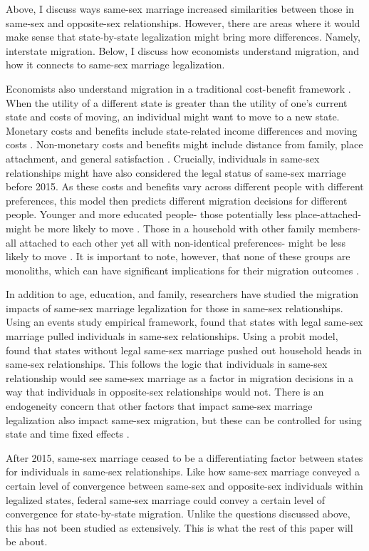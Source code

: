 \documentclass[12pt,letterpaper]{article}
\begin{document}
Above, I discuss ways same-sex marriage increased similarities between those in same-sex and opposite-sex relationships. However, there are areas where it would make sense that state-by-state legalization might bring more differences. Namely, interstate migration. Below, I discuss how economists understand migration, and how it connects to same-sex marriage legalization.

Economists also understand migration in a traditional cost-benefit framework \citep{12, 8}. When the utility of a different state is greater than the utility of one’s current state and costs of moving, an individual might want to move to a new state. Monetary costs and benefits include state-related income differences and moving costs \citep{1, 15, 16, 17}. Non-monetary costs and benefits might include distance from family, place attachment, and general satisfaction \citep{1, 15}. Crucially, individuals in same-sex relationships might have also considered the legal status of same-sex marriage before 2015. As these costs and benefits vary across different people with different preferences, this model then predicts different migration decisions for different people. Younger and more educated people- those potentially less place-attached- might be more likely to move \citep{17}. Those in a household with other family members- all attached to each other yet all with non-identical preferences- might be less likely to move \citep{16}. It is important to note, however, that none of these groups are monoliths, which can have significant implications for their migration outcomes \citep{20}. 

In addition to age, education, and family, researchers have studied the migration impacts of same-sex marriage legalization for those in same-sex relationships. Using an events study empirical framework, \citet{1} found that states with legal same-sex marriage pulled individuals in same-sex relationships. Using a probit model, \cite{12} found that states without legal same-sex marriage pushed out household heads in same-sex relationships. This follows the logic that individuals in same-sex relationship would see same-sex marriage as a factor in migration decisions in a way that individuals in opposite-sex relationships would not. There is an endogeneity concern that other factors that impact same-sex marriage legalization also impact same-sex migration, but these can be controlled for using state and time fixed effects \citep{5}. 

After 2015, same-sex marriage ceased to be a differentiating factor between states for individuals in same-sex relationships. Like how same-sex marriage conveyed a certain level of convergence between same-sex and opposite-sex individuals within legalized states, federal same-sex marriage could convey a certain level of convergence for state-by-state migration. Unlike the questions discussed above, this has not been studied as extensively. This is what the rest of this paper will be about. 
\end{document}
